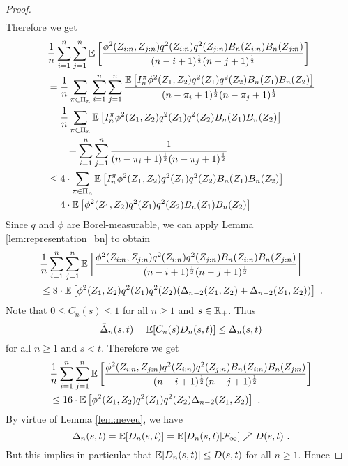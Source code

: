 \begin{lemma}
\begin{proof}
\begin{align*}
		\end{align*}
		Therefore we get
		\begin{align*}
		& \frac{1}{n}\sum_{i=1}^{n}\sum_{j=1}^{n}\mathbb{E}\left[\frac{\phi^2(Z_{i:n}, Z_{j:n}) q^2(Z_{i:n})q^2(Z_{j:n}) B_n(Z_{i:n})B_n(Z_{j:n})}{(n-i+1)^\frac{1}{2}(n-j+1)^\frac{1}{2}}\right]\\
		&= \frac{1}{n}\sum_{\pi \in\Pi_n} \sum_{i=1}^{n}\sum_{j=1}^{n}\frac{\mathbb{E}\left[I_n^\pi\phi^2(Z_{1}, Z_{2}) q^2(Z_{1})q^2(Z_{2}) B_n(Z_{1})B_n(Z_{2})\right]}{(n-\pi_i+1)^\frac{1}{2}(n-\pi_j+1)^\frac{1}{2}}\\
		&= \frac{1}{n}\sum_{\pi \in\Pi_n} \mathbb{E}\left[I_n^\pi\phi^2(Z_{1}, Z_{2}) q^2(Z_{1})q^2(Z_{2}) B_n(Z_{1})B_n(Z_{2})\right]\\
		&\qquad + \sum_{i=1}^{n}\sum_{j=1}^{n}\frac{1}{(n-\pi_i+1)^\frac{1}{2}(n-\pi_j+1)^\frac{1}{2}}\\
		&\leq 4\cdot \sum_{\pi \in\Pi_n} \mathbb{E}\left[I_n^\pi\phi^2(Z_{1}, Z_{2}) q^2(Z_{1})q^2(Z_{2}) B_n(Z_{1})B_n(Z_{2})\right]\\
		&= 4\cdot\mathbb{E}\left[\phi^2(Z_{1}, Z_{2}) q^2(Z_{1})q^2(Z_{2}) B_n(Z_{1})B_n(Z_{2})\right]\\
		\end{align*}
		Since $q$ and $\phi$ are Borel-measurable, we can apply Lemma \ref{lem:representation_bn} to obtain
		\begin{align*}
		& \frac{1}{n}\sum_{i=1}^{n}\sum_{j=1}^{n}\mathbb{E}\left[\frac{\phi^2(Z_{i:n}, Z_{j:n}) q^2(Z_{i:n})q^2(Z_{j:n}) B_n(Z_{i:n})B_n(Z_{j:n})}{(n-i+1)^\frac{1}{2}(n-j+1)^\frac{1}{2}}\right]\\
		&\leq 8\cdot\mathbb{E}\left[\phi^2(Z_{1}, Z_{2}) q^2(Z_{1})q^2(Z_{2})(\Delta_{n-2}(Z_1,Z_2) + \bar{\Delta}_{n-2}(Z_1,Z_2))\right]\textrm{ .}
		\end{align*}
		Note that $0\leq C_n(s)\leq 1$ for all $n\geq 1$ and $s\in \mathbb{R}_+$. Thus 
		$$\bar\Delta_n(s,t) = \mathbb{E}[C_n(s)D_n(s,t)] \leq \Delta_{n}(s,t)$$ 
		for all $n\geq 1$ and $s<t$.
		Therefore we get 
		\begin{align*}
		&\frac{1}{n}\sum_{i=1}^{n}\sum_{j=1}^{n}\mathbb{E}\left[\frac{\phi^2(Z_{i:n}, Z_{j:n}) q^2(Z_{i:n})q^2(Z_{j:n}) B_n(Z_{i:n})B_n(Z_{j:n})}{(n-i+1)^\frac{1}{2}(n-j+1)^\frac{1}{2}}\right]\\
		&\leq 16\cdot\mathbb{E}\left[\phi^2(Z_{1}, Z_{2}) q^2(Z_{1})q^2(Z_{2})\Delta_{n-2}(Z_1,Z_2)\right]\textrm{ .}
		\end{align*}	
		By virtue of Lemma \ref{lem:neveu}, we have
		$$\Delta_{n}(s,t) = \mathbb{E}[D_n(s,t)] = \mathbb{E}[D_n(s,t)|\mathcal{F}_\infty] \nearrow D(s,t)\textrm{ .}$$
		But this implies in particular that $\mathbb{E}[D_n(s,t)] \leq D(s,t)$ for all $n\geq 1$. Hence 

\end{proof}
\end{lemma}
